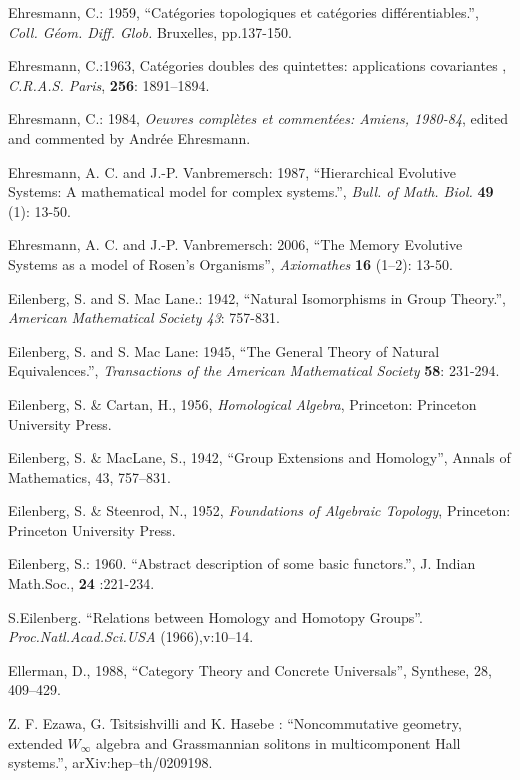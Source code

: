 \documentclass[12pt]{article}
\theoremstyle{plain}
\theoremstyle{definition}
\numberwithin{equation}{section}
\begin{document}
\begin{thebibliography}{99}
Ehresmann, C.: 1959, ``Cat\'egories topologiques et cat\'egories
diff\'erentiables.'', \emph{Coll. G\'eom. Diff. Glob.} Bruxelles, pp.137-150.

Ehresmann, C.:1963, Cat\'egories doubles des quintettes: applications covariantes
, \emph{C.R.A.S. Paris}, \textbf{256}: 1891--1894.

Ehresmann, C.: 1984, \emph{Oeuvres compl\`etes et  comment\'ees:
Amiens, 1980-84}, edited and commented by Andr\'ee Ehresmann.

Ehresmann, A. C. and J.-P. Vanbremersch: 1987, ``Hierarchical
Evolutive Systems: A mathematical model for complex systems.'',
\emph{Bull. of Math. Biol.} \textbf{49} (1): 13-50.

Ehresmann, A. C. and J.-P. Vanbremersch: 2006, ``The Memory Evolutive Systems as
a model of Rosen's Organisms'', \emph{Axiomathes} \textbf{16} (1--2): 13-50.

Eilenberg, S. and S. Mac Lane.: 1942, ``Natural Isomorphisms in Group Theory.'', \emph{American Mathematical Society 43}: 757-831.

Eilenberg, S. and S. Mac Lane: 1945, ``The General Theory of Natural Equivalences.'', \emph{Transactions of the American Mathematical Society} \textbf{58}: 231-294.

Eilenberg, S. \& Cartan, H., 1956, {\em Homological Algebra}, Princeton: Princeton University Press. 

Eilenberg, S. \& MacLane, S., 1942, ``Group Extensions and Homology'', Annals of Mathematics, 43, 757--831. 

Eilenberg, S. \& Steenrod, N., 1952, {\em Foundations of Algebraic Topology}, Princeton: Princeton University Press. 

Eilenberg, S.: 1960. ``Abstract description of some basic functors.'', J. Indian Math.Soc., \textbf{24} :221-234.

S.Eilenberg. ``Relations between Homology and Homotopy Groups''.
{\em Proc.Natl.Acad.Sci.USA} (1966),v:10--14.  

Ellerman, D., 1988, ``Category Theory and Concrete Universals'', Synthese, 28, 409--429. 

Z. F. Ezawa, G. Tsitsishvilli and K. Hasebe : ``Noncommutative
geometry, extended $W_{\infty}$ algebra and Grassmannian solitons
in multicomponent Hall systems.'', arXiv:hep--th/0209198.


\end{thebibliography}
\end{document}
